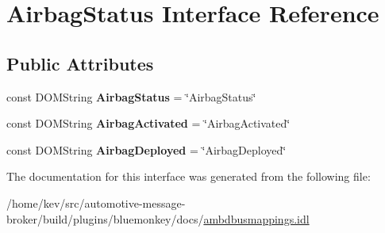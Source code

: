 \hypertarget{interfaceAirbagStatus}{\section{Airbag\+Status Interface Reference}
\label{interfaceAirbagStatus}
}
\subsection*{Public Attributes}
\begin{DoxyCompactItemize}
\item 
\hypertarget{interfaceAirbagStatus_abb2e5adf5994835739f37101ad7388a0}{const D\+O\+M\+String {\bfseries Airbag\+Status} = \char`\"{}Airbag\+Status\char`\"{}}\label{interfaceAirbagStatus_abb2e5adf5994835739f37101ad7388a0}

\item 
\hypertarget{interfaceAirbagStatus_a63769183e7384e723b358a56818e1b81}{const D\+O\+M\+String {\bfseries Airbag\+Activated} = \char`\"{}Airbag\+Activated\char`\"{}}\label{interfaceAirbagStatus_a63769183e7384e723b358a56818e1b81}

\item 
\hypertarget{interfaceAirbagStatus_ae5fea197fb5de4ec5c23d5c252f0c5ce}{const D\+O\+M\+String {\bfseries Airbag\+Deployed} = \char`\"{}Airbag\+Deployed\char`\"{}}\label{interfaceAirbagStatus_ae5fea197fb5de4ec5c23d5c252f0c5ce}

\end{DoxyCompactItemize}


The documentation for this interface was generated from the following file\+:\begin{DoxyCompactItemize}
\item 
/home/kev/src/automotive-\/message-\/broker/build/plugins/bluemonkey/docs/\hyperlink{ambdbusmappings_8idl}{ambdbusmappings.\+idl}\end{DoxyCompactItemize}
